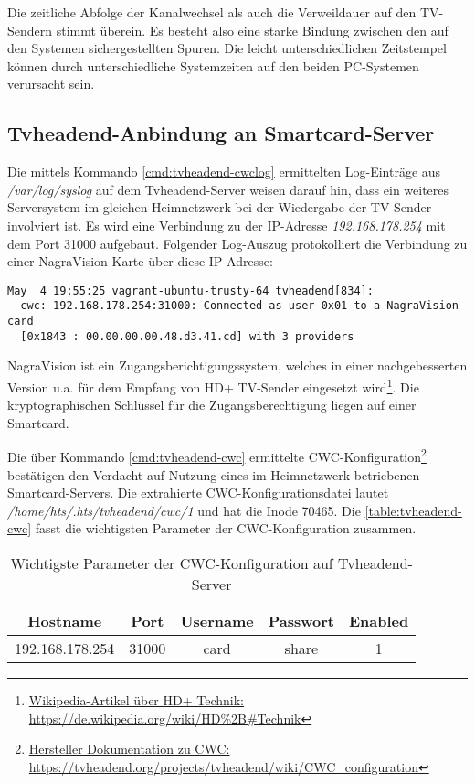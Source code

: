 Die zeitliche Abfolge der Kanalwechsel als auch die Verweildauer auf den TV-Sendern stimmt überein. Es besteht also eine starke Bindung zwischen den auf den Systemen sichergestellten Spuren. Die leicht unterschiedlichen Zeitstempel können durch unterschiedliche Systemzeiten auf den beiden PC-Systemen verursacht sein.

\subsection{Tvheadend-Anbindung an Smartcard-Server}

Die mittels Kommando \autoref{cmd:tvheadend-cwclog} ermittelten Log-Einträge aus \textit{/var/log/syslog} auf dem Tvheadend-Server weisen darauf hin, dass ein weiteres Serversystem im gleichen Heimnetzwerk bei der Wiedergabe der TV-Sender involviert ist. Es wird eine Verbindung zu der IP-Adresse \textit{192.168.178.254} mit dem Port 31000 aufgebaut. Folgender Log-Auszug protokolliert die Verbindung zu einer NagraVision-Karte über diese IP-Adresse:

\begin{Verbatim}
May  4 19:55:25 vagrant-ubuntu-trusty-64 tvheadend[834]: 
  cwc: 192.168.178.254:31000: Connected as user 0x01 to a NagraVision-card
  [0x1843 : 00.00.00.00.48.d3.41.cd] with 3 providers
\end{Verbatim}

NagraVision ist ein Zugangsberichtigungssystem, welches in einer nachgebesserten Version u.a. für dem Empfang von HD+ TV-Sender eingesetzt wird\footnote{\href{https://de.wikipedia.org/wiki/HD\%2B\#Technik}{Wikipedia-Artikel über HD+ Technik: https://de.wikipedia.org/wiki/HD\%2B\#Technik}}. Die kryptographischen Schlüssel für die Zugangsberechtigung liegen auf einer Smartcard.

Die über Kommando \autoref{cmd:tvheadend-cwc} ermittelte CWC-Konfiguration\footnote{\href{https://tvheadend.org/projects/tvheadend/wiki/CWC\_configuration}{Hersteller Dokumentation zu CWC: https://tvheadend.org/projects/tvheadend/wiki/CWC\_configuration}} bestätigen den Verdacht auf Nutzung eines im Heimnetzwerk betriebenen Smartcard-Servers. Die extrahierte CWC-Konfigurationsdatei lautet \textit{/home/hts/.hts/tvheadend/cwc/1} und hat die Inode 70465. Die \autoref{table:tvheadend-cwc} fasst die wichtigsten Parameter der CWC-Konfiguration zusammen.

\begin{table}[H]
\centering
\begin{tabular}{ccccc}
\toprule
Hostname & Port & Username & Passwort & Enabled \\ 
\midrule
192.168.178.254 & 31000 & card & share & 1 \\ 
\bottomrule
\end{tabular}
\caption{Wichtigste Parameter der CWC-Konfiguration auf Tvheadend-Server}
\label{table:tvheadend-cwc}
\end{table}

